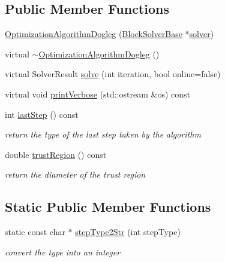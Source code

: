 \subsection*{Public Member Functions}
\begin{DoxyCompactItemize}
\item 
\mbox{\hyperlink{classg2o_1_1_optimization_algorithm_dogleg_ab332f8fb049d1a1fecba18105083052a}{Optimization\+Algorithm\+Dogleg}} (\mbox{\hyperlink{classg2o_1_1_block_solver_base}{Block\+Solver\+Base}} $\ast$\mbox{\hyperlink{classg2o_1_1_optimization_algorithm_with_hessian_a85473a4073c76b1a52cf9cf175e31c45}{solver}})
\item 
virtual \mbox{\hyperlink{classg2o_1_1_optimization_algorithm_dogleg_ac5ebd46eeca170f6a923c75556504d2b}{$\sim$\+Optimization\+Algorithm\+Dogleg}} ()
\item 
virtual Solver\+Result \mbox{\hyperlink{classg2o_1_1_optimization_algorithm_dogleg_ace62fd809c18655bd7ff104285748610}{solve}} (int iteration, bool online=false)
\item 
virtual void \mbox{\hyperlink{classg2o_1_1_optimization_algorithm_dogleg_a48f424443a7b2b6e8c532204cd7334cd}{print\+Verbose}} (std\+::ostream \&os) const
\item 
int \mbox{\hyperlink{classg2o_1_1_optimization_algorithm_dogleg_a0ca98964e7bcde0c893eb9d720a26fd1}{last\+Step}} () const
\begin{DoxyCompactList}\small\item\em return the type of the last step taken by the algorithm \end{DoxyCompactList}\item 
double \mbox{\hyperlink{classg2o_1_1_optimization_algorithm_dogleg_a3c6fdb2f8296330fd754d635a67b3696}{trust\+Region}} () const
\begin{DoxyCompactList}\small\item\em return the diameter of the trust region \end{DoxyCompactList}\end{DoxyCompactItemize}
\subsection*{Static Public Member Functions}
\begin{DoxyCompactItemize}
\item 
static const char $\ast$ \mbox{\hyperlink{classg2o_1_1_optimization_algorithm_dogleg_a65f193c6451ffcd2bd6fd8f8d19e2a12}{step\+Type2\+Str}} (int step\+Type)
\begin{DoxyCompactList}\small\item\em convert the type into an integer \end{DoxyCompactList}\end{DoxyCompactItemize}
